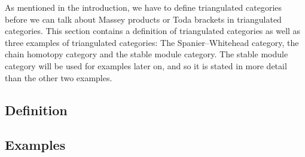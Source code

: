 As mentioned in the introduction, we have to define triangulated categories before we can talk about Massey products or Toda brackets in triangulated categories. This section contains a definition of triangulated categories as well as three examples of triangulated categories: The Spanier--Whitehead category, the chain homotopy category and the stable module category. The stable module category will be used for examples later on, and so it is stated in more detail than the other two examples.

\subsection{Definition}


\subsection{Examples}
